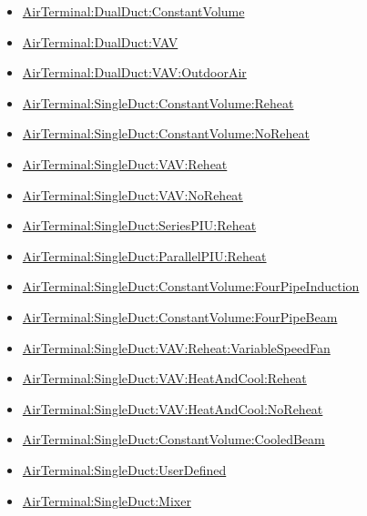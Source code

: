 \begin{itemize}
\item
  \hyperref[airterminaldualductconstantvolume]{AirTerminal:DualDuct:ConstantVolume}
\item
  \hyperref[airterminaldualductvav]{AirTerminal:DualDuct:VAV}
\item
  \hyperref[airterminaldualductvavoutdoorair]{AirTerminal:DualDuct:VAV:OutdoorAir}
\item
  \hyperref[airterminalsingleductconstantvolumereheat]{AirTerminal:SingleDuct:ConstantVolume:Reheat}  
\item
  \hyperref[airterminalsingleductconstantvolumenoreheat]{AirTerminal:SingleDuct:ConstantVolume:NoReheat}
\item
  \hyperref[airterminalsingleductvavreheat]{AirTerminal:SingleDuct:VAV:Reheat}
\item
  \hyperref[airterminalsingleductvavnoreheat]{AirTerminal:SingleDuct:VAV:NoReheat}
\item
  \hyperref[airterminalsingleductseriespiureheat]{AirTerminal:SingleDuct:SeriesPIU:Reheat}
\item
  \hyperref[airterminalsingleductparallelpiureheat]{AirTerminal:SingleDuct:ParallelPIU:Reheat}
\item
  \hyperref[airterminalsingleductconstantvolumefourpipeinduction]{AirTerminal:SingleDuct:ConstantVolume:FourPipeInduction}
\item
  \hyperref[airterminalsingleductconstantvolumefourpipebeam]{AirTerminal:SingleDuct:ConstantVolume:FourPipeBeam}
\item
  \hyperref[airterminalsingleductvavreheatvariablespeedfan]{AirTerminal:SingleDuct:VAV:Reheat:VariableSpeedFan}
\item
  \hyperref[airterminalsingleductvavheatandcoolreheat]{AirTerminal:SingleDuct:VAV:HeatAndCool:Reheat}
\item
  \hyperref[airterminalsingleductvavheatandcoolnoreheat]{AirTerminal:SingleDuct:VAV:HeatAndCool:NoReheat}
\item
  \hyperref[airterminalsingleductconstantvolumecooledbeam]{AirTerminal:SingleDuct:ConstantVolume:CooledBeam}
\item
  \hyperref[airterminalsingleductuserdefined]{AirTerminal:SingleDuct:UserDefined}
\item
  \hyperref[airterminalsingleductmixer]{AirTerminal:SingleDuct:Mixer}

\end{itemize}

